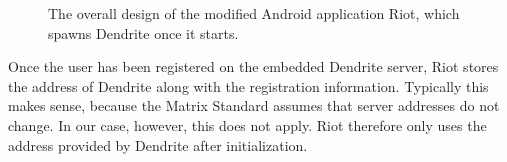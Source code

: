 \begin{figure}
	\centering
	\resizebox{0.5\linewidth}{!}{}
	\caption{%
		The overall design of the modified Android application Riot, which spawns Dendrite once it starts.
	}%
	\label{fig:design_constraints}
\end{figure}

Once the user has been registered on the embedded Dendrite server, Riot stores the address of Dendrite along with the registration information.
Typically this makes sense, because the Matrix Standard assumes that server addresses do not change.
In our case, however, this does not apply.
Riot therefore only uses the address provided by Dendrite after initialization.
